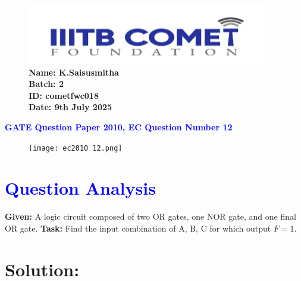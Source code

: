 \documentclass[twocolumn]{article}
\begin{document}
\begin{figure}[t]
    \includegraphics[width=\linewidth]{img3.png} %
        \textbf{Name: K.Saisusmitha} \\
    \textbf{Batch: 2} \\
    \textbf{ID: cometfwc018} \\
    \textbf{Date: 9th July 2025}
\end{figure}

\begin{center}
    {\LARGE \textbf{\textcolor{blue}{GATE Question Paper 2010, EC Question Number 12}}}
\end{center}

\vspace{1em}
\vspace{1em}
\begin{figure}[h]
    \centering
    \texttt{[image: ec2010 12.png]}
\end{figure}

\section*{\textcolor{blue}{Question Analysis}}
\textbf{Given:} A logic circuit composed of two OR gates, one NOR gate, and one final OR gate.  
\textbf{Task:} Find the input combination of A, B, C for which output $F=1$.

\section*{Solution:}
\end{document}
